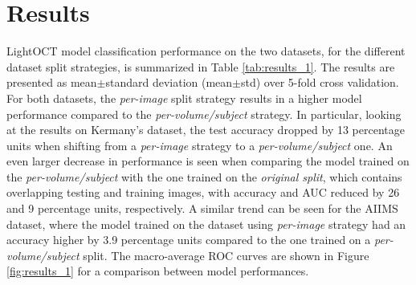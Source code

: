 \documentclass[fleqn,10pt]{wlscirep}
\begin{document}
\section*{Results}
LightOCT model classification performance on the two datasets, for the different dataset split strategies, is summarized in Table \ref{tab:results_1}. The results are presented as mean$\pm$standard deviation (mean$\pm$std) over 5-fold cross validation. For both datasets, the \textit{per-image} split strategy results in a higher model performance compared to the \textit{per-volume/subject} strategy. In particular, looking at the results on Kermany’s dataset, the test accuracy dropped by 13 percentage units when shifting from a \textit{per-image} strategy to a \textit{per-volume/subject} one. An even larger decrease in performance is seen when comparing the model trained on the \textit{per-volume/subject} with the one trained on the \textit{original split}, which contains overlapping testing and training images, with accuracy and AUC reduced by 26 and 9 percentage units, respectively. A similar trend can be seen for the AIIMS dataset, where the model trained on the dataset using \textit{per-image} strategy had an accuracy higher by 3.9 percentage units compared to the one trained on a \textit{per-volume/subject} split. The macro-average ROC curves are shown in Figure \ref{fig:results_1} for a comparison between model performances. 
\end{document}
